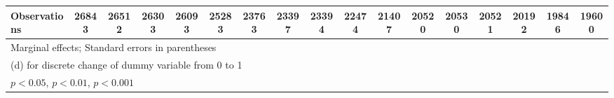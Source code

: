 {\begin{tabular}{l*{16}{c}}
\hline
Observations        &       26843         &       26512         &       26303         &       26093         &       25283         &       23763         &       23397         &       23394         &       22474         &       21407         &       20520         &       20530         &       20521         &       20192         &       19846         &       19600         \\
\hline\hline
\multicolumn{17}{l}{\footnotesize Marginal effects; Standard errors in parentheses}\\
\multicolumn{17}{l}{\footnotesize  (d) for discrete change of dummy variable from 0 to 1}\\
\multicolumn{17}{l}{\footnotesize \sym{*} \(p<0.05\), \sym{**} \(p<0.01\), \sym{***} \(p<0.001\)}\\
\end{tabular}
}
